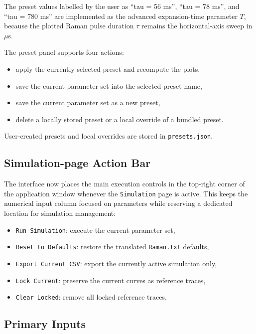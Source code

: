 \documentclass[11pt,a4paper]{article}
\begin{document}
The preset values labelled by the user as ``tau = 56 ms'', ``tau = 78 ms'', and ``tau = 780 ms''
are implemented as the advanced expansion-time parameter $T$, because the plotted Raman pulse
duration $\tau$ remains the horizontal-axis sweep in $\mu$s.

The preset panel supports four actions:

\begin{itemize}
  \item apply the currently selected preset and recompute the plots,
  \item save the current parameter set into the selected preset name,
  \item save the current parameter set as a new preset,
  \item delete a locally stored preset or a local override of a bundled preset.
\end{itemize}

User-created presets and local overrides are stored in \texttt{presets.json}.

\subsection{Simulation-page Action Bar}

The interface now places the main execution controls in the top-right corner of the application
window whenever the \texttt{Simulation} page is active. This keeps the numerical input column
focused on parameters while reserving a dedicated location for simulation management:

\begin{itemize}
  \item \texttt{Run Simulation}: execute the current parameter set,
  \item \texttt{Reset to Defaults}: restore the translated \texttt{Raman.txt} defaults,
  \item \texttt{Export Current CSV}: export the currently active simulation only,
  \item \texttt{Lock Current}: preserve the current curves as reference traces,
  \item \texttt{Clear Locked}: remove all locked reference traces.
\end{itemize}

\subsection{Primary Inputs}
\end{document}
